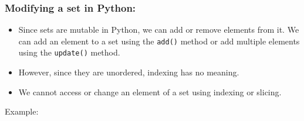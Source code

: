 \documentclass[11pt]{article}
\providecommand{\tightlist}{%
      \setlength{\itemsep}{0pt}\setlength{\parskip}{0pt}}
\begin{document}
\hypertarget{modifying-a-set-in-python}{%
\subsubsection{Modifying a set in
Python:}\label{modifying-a-set-in-python}}

\begin{itemize}
\tightlist
\item
  Since sets are mutable in Python, we can add or remove elements from
  it. We can add an element to a set using the \texttt{add()} method or
  add multiple elements using the \texttt{update()} method.
\item
  However, since they are unordered, indexing has no meaning.
\item
  We cannot access or change an element of a set using indexing or
  slicing.
\end{itemize}

Example:
\end{document}
